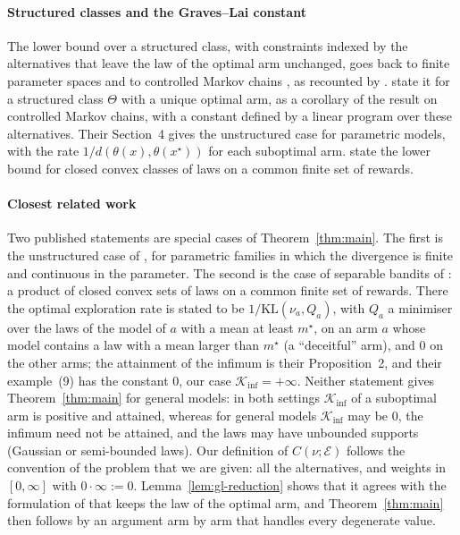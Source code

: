 \documentclass[11pt]{article}
\begin{document}
\paragraph{Structured classes and the Graves--Lai constant} The lower bound over a structured class,
with constraints indexed by the alternatives that leave the law of the optimal arm unchanged, goes
back to finite parameter spaces and to controlled Markov chains \citep[see also][]{ATA89,GL97}, as
recounted by \citet[Section~4]{VPG24}. \citet[Theorem~1]{CMP17} state it for a structured class
$\Theta$ with a unique optimal arm, as a corollary of the result on controlled Markov chains, with a
constant defined by a linear program over these alternatives. Their Section~4 gives the
unstructured case for parametric models, with the rate $1/d(\theta(x),\theta(x^\star))$ for each
suboptimal arm. \citet[Proposition~1]{VPG24} state the lower bound for closed convex classes of laws
on a common finite set of rewards.

\paragraph{Closest related work} Two published statements are special cases of
Theorem~\ref{thm:main}. The first is the unstructured case of \citet[Section~4]{CMP17}, for
parametric families in which the divergence is finite and continuous in the parameter. The second
is the case of separable bandits of \citet[Example~3, with Propositions~1 and~2]{VPG24}: a product
of closed convex sets of laws on a common finite set of rewards. There the optimal exploration rate
is stated to be $1/\mathrm{KL}(\nu_a,Q_a)$, with $Q_a$ a minimiser over the laws of the model of $a$
with a mean at least $m^\star$, on an arm $a$ whose model contains a law with a mean larger than
$m^\star$ (a ``deceitful'' arm), and $0$ on the other arms; the attainment of the infimum is their
Proposition~2, and their example~(9) has the constant $0$, our case $\mathcal K_{\inf}=+\infty$.
Neither statement gives Theorem~\ref{thm:main} for general models: in both settings
$\mathcal K_{\inf}$ of a suboptimal arm is positive and attained, whereas for general models $\mathcal K_{\inf}$ may be $0$, the infimum need
not be attained, and the laws may have unbounded supports (Gaussian or semi-bounded laws). Our
definition of $C(\nu;\mathcal E)$ follows the convention of the problem that we are given: all the
alternatives, and weights in $[0,\infty]$ with $0\cdot\infty:=0$. Lemma~\ref{lem:gl-reduction}
shows that it agrees with the formulation of \citet{CMP17} that keeps the law of the optimal arm,
and Theorem~\ref{thm:main} then follows by an argument arm by arm that handles every degenerate
value.
\end{document}

